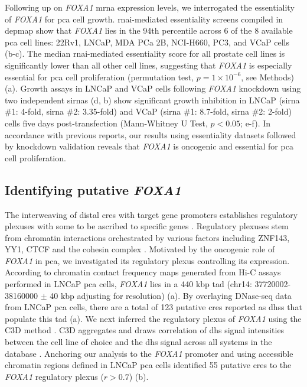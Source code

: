 Following up on \emph{FOXA1} \gls{mrna} expression levels, we interrogated the essentiality of \emph{FOXA1} for \gls{pca} cell growth.
\gls{rnai}-mediated essentiality screens compiled in \gls{depmap} show that \emph{FOXA1} lies in the 94th percentile across 6 of the 8 available \gls{pca} cell lines: 22Rv1, LNCaP, MDA PCa 2B, NCI-H660, PC3, and VCaP cells (b-c).
The median \gls{rnai}-mediated essentiality score for all prostate cell lines is significantly lower than all other cell lines, suggesting that \emph{FOXA1} is especially essential for \gls{pca} cell proliferation (permutation test, $p = 1 \times 10^{-6}$, see Methods) (a).
Growth assays in LNCaP and VCaP cells following \emph{FOXA1} knockdown using two independent \gls{sirna}s (d, b) show significant growth inhibition in LNCaP (\gls{sirna} \#1: 4-fold, \gls{sirna} \#2: 3.35-fold) and VCaP (\gls{sirna} \#1: 8.7-fold, \gls{sirna} \#2: 2-fold) cells five days post-transfection (Mann-Whitney U Test, $p<0.05$; e-f).
In accordance with previous reports, our results using essentiality datasets followed by knockdown validation reveals that \emph{FOXA1} is oncogenic and essential for \gls{pca} cell proliferation.

\subsection{Identifying putative \emph{FOXA1} }

The interweaving of distal \glspl{cre} with target gene promoters establishes regulatory plexuses with some to be ascribed to specific genes \cite{sallariConvergenceDispersedRegulatory2016,baileyNoncodingSomaticInherited2016}.
Regulatory plexuses stem from chromatin interactions orchestrated by various factors including ZNF143, YY1, CTCF and the cohesin complex \cite{phillipsCTCFMasterWeaver2009,weintraubYY1StructuralRegulator2017,baileyZNF143ProvidesSequence2015}.
Motivated by the oncogenic role of \emph{FOXA1} in \gls{pca}, we investigated its regulatory plexus controlling its expression.
According to chromatin contact frequency maps generated from Hi-C assays performed in LNCaP \gls{pca} cells, \emph{FOXA1} lies in a 440 \gls{kbp} \gls{tad} (chr14: 37720002-38160000 $\pm$ 40 \gls{kbp} adjusting for resolution) (a).
By overlaying DNase-seq data from LNCaP \gls{pca} cells, there are a total of 123 putative \glspl{cre} reported as \glspl{dhs} that populate this \gls{tad} (a).
We next inferred the regulatory plexus of \emph{FOXA1} using the C3D method \cite{mehdiC3DToolPredict2019}.
C3D aggregates and draws correlation of \gls{dhs} signal intensities between the cell line of choice and the \gls{dhs} signal across all systems in the database \cite{mehdiC3DToolPredict2019}.
Anchoring our analysis to the \emph{FOXA1} promoter and using accessible chromatin regions defined in LNCaP \gls{pca} cells identified 55 putative \glspl{cre} to the \emph{FOXA1} regulatory plexus ($r > 0.7$) (b).

